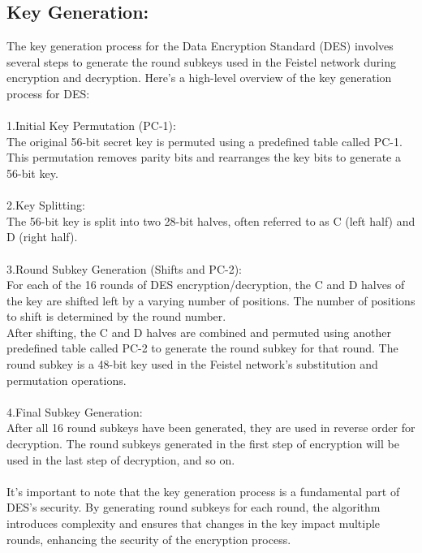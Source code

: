 \documentclass{report}
\begin{document}
\subsection{Key Generation:}
The key generation process for the Data Encryption Standard (DES) involves several steps to generate the round subkeys used in the Feistel network during encryption and decryption. Here's a high-level overview of the key generation process for DES:\\
\\
1.Initial Key Permutation (PC-1):\\
The original 56-bit secret key is permuted using a predefined table called PC-1. This permutation removes parity bits and rearranges the key bits to generate a 56-bit key.\\
\\
2.Key Splitting:\\
The 56-bit key is split into two 28-bit halves, often referred to as C (left half) and D (right half).\\
\\
3.Round Subkey Generation (Shifts and PC-2):\\
For each of the 16 rounds of DES encryption/decryption, the C and D halves of the key are shifted left by a varying number of positions. The number of positions to shift is determined by the round number.\\
After shifting, the C and D halves are combined and permuted using another predefined table called PC-2 to generate the round subkey for that round. The round subkey is a 48-bit key used in the Feistel network's substitution and permutation operations.\\
\\
4.Final Subkey Generation:\\
After all 16 round subkeys have been generated, they are used in reverse order for decryption. The round subkeys generated in the first step of encryption will be used in the last step of decryption, and so on.\\
\\
It's important to note that the key generation process is a fundamental part of DES's security. By generating round subkeys for each round, the algorithm introduces complexity and ensures that changes in the key impact multiple rounds, enhancing the security of the encryption process.
\end{document}
